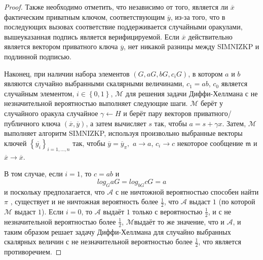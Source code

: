 \documentclass{mrl}
\theoremstyle{definition}
\numberwithin{thm}{section}
\begin{document}
\begin{proof}
Также необходимо отметить, что независимо от того, является ли $\overline{x}$ фактическим приватным ключом, соответствующим $\overline{y}$, из-за того, что в последующих вызовах соответствие поддерживается случайными оракулами, вышеуказанная подпись является верифицируемой. Если $\overline{x}$ действительно является вектором приватного ключа $\overline{y}$, нет никакой разницы между SIMNIZKP и подлинной подписью.

Наконец, при наличии набора элементов $\left(G,aG,bG,c_{i}G\right)$, в котором $a$ и $b$ являются случайно выбранными скалярными величинами, $c_{1}=ab$, $c_{0}$ является случайным элементом, $i\in\left\{ 0,1\right\}$, $\mathcal{M}$ для решения задачи Диффи-Хеллмана с не незначительной вероятностью выполняет следующие шаги. $\mathcal{M}$ берёт у случайного оракула случайное $\gamma\leftarrow H$ и берёт пару векторов приватного/публичного ключа $\left(\overline{x},\overline{y}\right)$, а затем вычисляет $s$ так, чтобы $a=s+\gamma x$. Затем, $\mathcal{M}$ выполняет алгоритм SIMNIZKP, используя произвольно выбранные векторы ключей $\left\{ \overline{y_{i}}\right\} _{i=1,...,n}$ так, чтобы $\overline{y}=\overline{y}_{\pi},$ $a\to a$, $c_{i}\to c$ некоторое сообщение $\mathfrak{m}$ и $\overline{x}\to\overline{x}$.

В том случае, если $i=1$, то $c=ab$ и
\[
log_{G}aG=log_{bG}cG=a
\]
и поскольку предполагается, что $\mathcal{A}$ с не ничтожной вероятностью способен найти $\pi$ , существует и не ничтожная вероятность более $\frac{1}{2}$, что $\mathcal{A}$ выдаст $1$ (по которой $\mathcal{M}$ выдаст $1$). Если $i=0$, то $\mathcal{A}$
выдаёт $1$ только с вероятностью $\frac{1}{2}$, и с не незначительной вероятностью более $\frac{1}{2}$, $\mathcal{M}$выдаёт то же значение, что и $\mathcal{A}$, и таким образом решает задачу Диффи-Хеллмана для случайно выбранных скалярных величин с не незначительной вероятностью более $\frac{1}{2}$, что является противоречием.
\end{proof}
\end{document}
